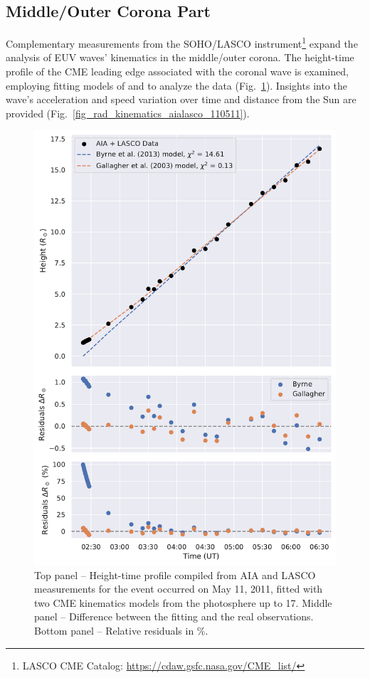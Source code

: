 \subsection{Middle/Outer Corona Part}
Complementary measurements from the SOHO/LASCO instrument\footnote{LASCO CME Catalog: \url{https://cdaw.gsfc.nasa.gov/CME_list/}} expand the analysis of EUV waves' kinematics in the middle/outer corona. The height-time profile of the CME leading edge associated with the coronal wave is examined, employing fitting models of \citet{gallagher_2003} and \citet{byrne_2013} to analyze the data (Fig.~\ref{fig_height_profile_aialasco_110511}). Insights into the wave's acceleration and speed variation over time and distance from the Sun are provided (Fig.~\ref{fig_rad_kinematics_aialasco_110511}).

\begin{figure}[!htp] %
	\centerline{\includegraphics[width=0.7\columnwidth]{chapter2/figs/height_profile_residuals_aia_lasco_110511_01.pdf}}
	\caption{Top panel -- Height-time profile compiled from AIA and LASCO measurements for the event occurred on May 11, 2011, fitted with two CME kinematics models from the photosphere up to 17\rsun. Middle panel -- Difference between the fitting and the real observations. Bottom panel -- Relative residuals in \%.}
	\label{fig_height_profile_aialasco_110511}
\end{figure}

